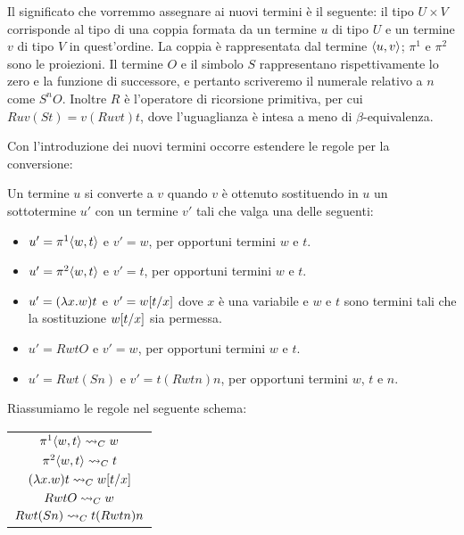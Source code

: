 \documentclass[]{marticle}
\begin{document}
Il significato che vorremmo assegnare ai nuovi termini \`e il seguente: il tipo
$U\times V$ corrisponde al tipo di una coppia formata da un termine $u$ di tipo
$U$ e un termine $v$ di tipo $V$ in quest'ordine. La coppia \`e rappresentata
dal termine $\langle u,v \rangle$; $\pi^1$ e $\pi^2$ sono le proiezioni.  Il termine $O$ e
il simbolo $S$ rappresentano rispettivamente lo zero e la funzione di
successore, e pertanto scriveremo il numerale relativo a $n$ come $S^nO$.
Inoltre $R$ \`e l'operatore di ricorsione primitiva, per cui $Ruv(St) =
v(Ruvt)t$, dove l'uguaglianza \`e intesa a meno di $\beta$-equivalenza.

Con l'introduzione dei nuovi termini occorre estendere le regole per la
conversione:
\begin{block}[Definizione]
    Un termine $u$ si converte a $v$ quando $v$ \`e ottenuto sostituendo in $u$
    un sottotermine $u'$ con un termine $v'$ tali che valga una delle seguenti:
    \begin{itemize}
        \item $u'=\pi^1\langle w,t \rangle$ e $v'=w$, per opportuni termini $w$ e $t$.
        \item $u'=\pi^2\langle w,t \rangle$ e $v'=t$, per opportuni termini $w$ e $t$.
        \item $u'= (\lambda x. w)t$ e $v' = w[t/x]$ dove $x$ \`e una variabile e
            $w$ e $t$ sono termini tali che la sostituzione $w[t/x]$ sia
            permessa.
        \item $u' = RwtO$ e $v'=w$, per opportuni termini $w$ e $t$.
        \item $u' = Rwt(Sn)$ e $v' = t(Rwtn)n$, per opportuni termini $w$, $t$ e
            $n$.
    \end{itemize}
\end{block}

Riassumiamo le regole nel seguente schema:

\begin{center}
{\renewcommand{\arraystretch}{1.3} 
\begin{tabular}{|c|}
    \hline
    $\pi^1\langle w,t \rangle\rightsquigarrow_C w$ \\
    $\pi^2\langle w,t \rangle\rightsquigarrow_C t$ \\
    $(\lambda x. w) t \rightsquigarrow_C w[t/x]$ \\
    $RwtO\rightsquigarrow_C w$ \\
    $Rwt(Sn) \rightsquigarrow_C t(Rwtn)n$\\
    \hline
\end{tabular}
}
\end{center}
\end{document}
